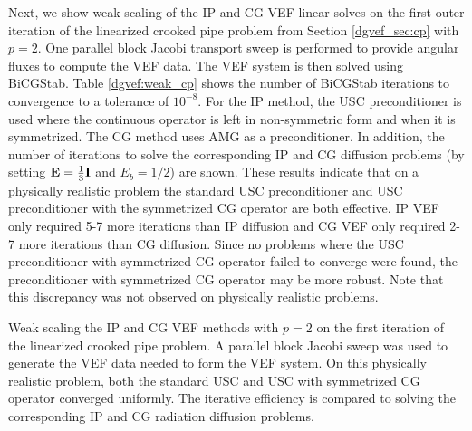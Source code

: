\documentclass[../doc.tex]{subfiles}
\begin{document}
Next, we show weak scaling of the IP and CG VEF linear solves on the first outer iteration of the linearized crooked pipe problem from Section \ref{dgvef_sec:cp} with $p=2$. One parallel block Jacobi transport sweep is performed to provide angular fluxes to compute the VEF data. The VEF system is then solved using BiCGStab. Table \ref{dgvef:weak_cp} shows the number of BiCGStab iterations to convergence to a tolerance of $10^{-8}$. For the IP method, the USC preconditioner is used where the continuous operator is left in non-symmetric form and when it is symmetrized. The CG method uses AMG as a preconditioner. In addition, the number of iterations to solve the corresponding IP and CG diffusion problems (by setting $\boldsymbol{\mathrm{E}} = \frac{1}{3}\boldsymbol{\mathrm{I}}$ and $E_b = 1/2$) are shown. These results indicate that on a physically realistic problem the standard USC preconditioner and USC preconditioner with the symmetrized CG operator are both effective. IP VEF only required 5-7 more iterations than IP diffusion and CG VEF only required 2-7 more iterations than CG diffusion. Since no problems where the USC preconditioner with symmetrized CG operator failed to converge were found, the preconditioner with symmetrized CG operator may be more robust. Note that this discrepancy was not observed on physically realistic problems. 
\begin{table}
\centering
\caption{Weak scaling the IP and CG VEF methods with $p=2$ on the first iteration of the linearized crooked pipe problem. A parallel block Jacobi sweep was used to generate the VEF data needed to form the VEF system. On this physically realistic problem, both the standard USC and USC with symmetrized CG operator converged uniformly. The iterative efficiency is compared to solving the corresponding IP and CG radiation diffusion problems. }
\label{dgvef:weak_cp}

\end{table}
\end{document}
